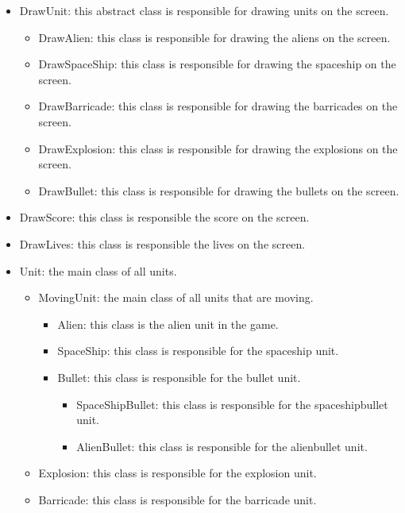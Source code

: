 \documentclass[10pt]{article}
\begin{document}
\begin{itemize}
	\item DrawUnit: this abstract class is responsible for drawing units on the screen.
	\begin{itemize}
		\item DrawAlien: this class is responsible for drawing the aliens on the screen.
		\item DrawSpaceShip: this class is responsible for drawing the spaceship on the screen.
		\item DrawBarricade: this class is responsible for drawing the barricades on the screen.
		\item DrawExplosion: this class is responsible for drawing the explosions on the screen.
		\item DrawBullet: this class is responsible for drawing the bullets on the screen.
	\end{itemize}
	\item DrawScore: this class is responsible the score on the screen.
	\item DrawLives: this class is responsible the lives on the screen.
\end{itemize}
\begin{itemize}
\item Unit: the main class of all units.
\begin{itemize}
\item MovingUnit: the main class of all units that are moving.
\begin{itemize}
\item Alien: this class is the alien unit in the game.
\item SpaceShip: this class is responsible for the spaceship unit.
\item Bullet: this class is responsible for the bullet unit.
\begin{itemize}
\item SpaceShipBullet: this class is responsible for the spaceshipbullet unit.
\item AlienBullet: this class is responsible for the alienbullet unit.
\end{itemize}
\end{itemize}
\item Explosion: this class is responsible for the explosion unit.
\item Barricade: this class is responsible for the barricade unit.
\end{itemize}
\end{itemize}
\end{document}

